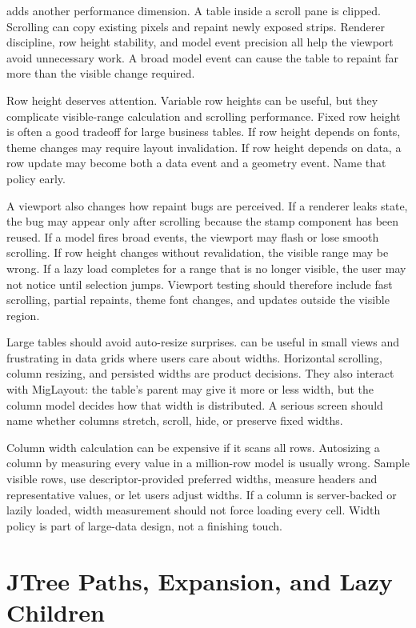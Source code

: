  adds another performance dimension. A table inside a scroll pane is clipped. Scrolling can copy existing pixels and repaint newly exposed strips. Renderer discipline, row height stability, and model event precision all help the viewport avoid unnecessary work. A broad model event can cause the table to repaint far more than the visible change required.

Row height deserves attention. Variable row heights can be useful, but they complicate visible-range calculation and scrolling performance. Fixed row height is often a good tradeoff for large business tables. If row height depends on fonts, theme changes may require layout invalidation. If row height depends on data, a row update may become both a data event and a geometry event. Name that policy early.

A viewport also changes how repaint bugs are perceived. If a renderer leaks state, the bug may appear only after scrolling because the stamp component has been reused. If a model fires broad events, the viewport may flash or lose smooth scrolling. If row height changes without revalidation, the visible range may be wrong. If a lazy load completes for a range that is no longer visible, the user may not notice until selection jumps. Viewport testing should therefore include fast scrolling, partial repaints, theme font changes, and updates outside the visible region.

Large tables should avoid auto-resize surprises.  can be useful in small views and frustrating in data grids where users care about widths. Horizontal scrolling, column resizing, and persisted widths are product decisions. They also interact with MigLayout: the table's parent may give it more or less width, but the column model decides how that width is distributed. A serious screen should name whether columns stretch, scroll, hide, or preserve fixed widths.

Column width calculation can be expensive if it scans all rows. Autosizing a column by measuring every value in a million-row model is usually wrong. Sample visible rows, use descriptor-provided preferred widths, measure headers and representative values, or let users adjust widths. If a column is server-backed or lazily loaded, width measurement should not force loading every cell. Width policy is part of large-data design, not a finishing touch.

\section{JTree Paths, Expansion, and Lazy Children}

